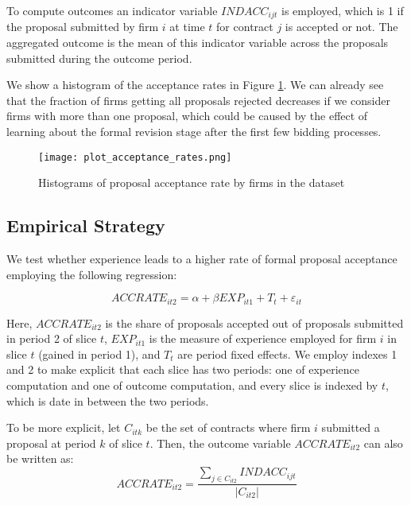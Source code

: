 To compute outcomes an indicator variable $INDACC_{ijt}$ is employed, which is 1 if the proposal submitted by firm $i$ at time $t$ for contract $j$ is accepted or not. The aggregated outcome is the mean of this indicator variable across the proposals submitted during the outcome period.

We show a histogram of the acceptance rates in Figure \ref{fig:plot_acceptance_rates}. We can already see that the fraction of firms getting all proposals rejected decreases if we consider firms with more than one proposal, which could be caused by the effect of learning about the formal revision stage after the first few bidding processes.

\begin{figure}
  \texttt{[image: plot\_acceptance\_rates.png]}
  \caption{Histograms of proposal acceptance rate by firms in the dataset}
  \label{fig:plot_acceptance_rates}
\end{figure}

\subsection{Empirical Strategy}
We test whether experience leads to a higher rate of formal proposal acceptance employing the following regression:

\begin{equation}
\label{eqn:olsspec}
ACCRATE_{it2}=\alpha+ \beta EXP_{it1}+T_t+\varepsilon_{it}
\end{equation}

Here, $ACCRATE_{it2}$ is the share of proposals accepted out of proposals submitted in period 2 of slice $t$, $EXP_{it1} $ is the measure of experience employed for firm $i$ in slice $t$ (gained in period 1), and $T_t$ are period fixed effects. We employ indexes 1 and 2 to make explicit that each slice has two periods: one of experience computation and one of outcome computation, and every slice is indexed by $t$, which is date in between the two periods.

To be more explicit, let $C_{itk}$ be the set of contracts where firm $i$ submitted a proposal at period $k$ of slice $t$. Then, the outcome variable $ACCRATE_{it2}$ can also be written as:
$$  ACCRATE_{it2}=\dfrac{\sum_{j\in C_{it2}}INDACC_{ijt}}{|C_{it2}|}$$


